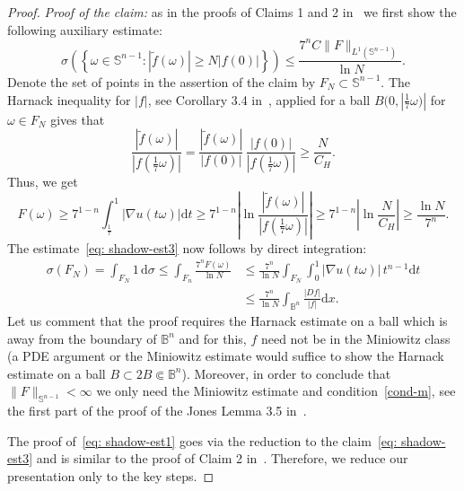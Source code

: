 \documentclass[11pt,a4paper,reqno]{amsart}
\theoremstyle{definition}
\newcommand{\om}{\omega}
\newcommand{\B}{\mathbb{B}^n}
\newcommand{\ud}{\mathrm {d}}
\newcommand{\Sn}{\mathbb{S}^{n-1}}
\numberwithin{komcounter}{section}
\begin{document}
\begin{proof}
\emph{Proof of the claim:} as in the proofs of Claims 1 and 2 in~\cite[Proposition 3.8]{ag2} we first show the following auxiliary estimate:
\begin{equation}\label{eq: shadow-est3}
 \sigma\left(\left\{\om \in \Sn: |\tilde{f}(\om)|\geq N |f(0)| \right\}\right)\leq \frac{7^n C \|F\|_{L^1(\Sn)}}{\ln N}.
\end{equation}
Denote the set of points in the assertion of the claim by $F_N\subset \Sn$. The Harnack inequality for $|f|$, see Corollary 3.4 in~\cite{ag2}, applied for a ball $B(0,|\frac17 \om)|$ for $\om\in F_N$ gives that 
\begin{equation}\label{est-aux-f}
 \frac{|\tilde{f}(\om)|}{|f(\frac17\om)|}= \frac{|\tilde{f}(\om)|}{|f(0)|}\, \frac{|f(0)|}{|f(\frac17\om)|}\geq \frac{N}{C_H}.
\end{equation}
Thus, we get
\[
 F(\om)\geq 7^{1-n}\int_{\frac17}^{1} |\nabla u(t\om)|\ud t\geq 7^{1-n}\left|\ln \frac{|\tilde{f}(\om)|}{|f(\frac17 \om)|}\right|
 \geq 7^{1-n}\left|\ln \frac{N}{C_H}\right|\geq \frac{\ln N}{7^n}.
\]
 The estimate~\eqref{eq: shadow-est3} now follows by direct integration:
 \begin{align*}
 \sigma (F_N)=\int_{F_N} 1\,\ud \sigma \leq \int_{F_n} \frac{7^n F(\om)}{\ln N} &\leq \frac{7^n}{\ln N} \int_{F_N} \int_{0}^{1}|\nabla u(t\om)|\,t^{n-1}\ud t \\
& \leq \frac{7^n}{\ln N} \int_{\B} \frac{|Df|}{|f|} \ud x.
 \end{align*}
Let us comment that the proof requires the Harnack estimate on a ball which is away from the boundary of $\B$ and for this, $f$ need not be in the Miniowitz class (a PDE argument or the Miniowitz estimate would suffice to show the Harnack estimate on a ball $B\subset 2B\Subset \B$). Moreover, in order to conclude that $\|F\|_{\Sn}<\infty$ we only need the Miniowitz estimate and condition~\eqref{cond-m}, see the first part of the proof of the Jones Lemma 3.5 in~\cite{ag2}.

\smallskip

 The proof of~\eqref{eq: shadow-est1} goes via the reduction to the claim~\eqref{eq: shadow-est3} and is similar to the proof of Claim 2 in~\cite{ag2}. Therefore, we reduce our presentation only to the key steps.
 

\end{proof}
\end{document}
